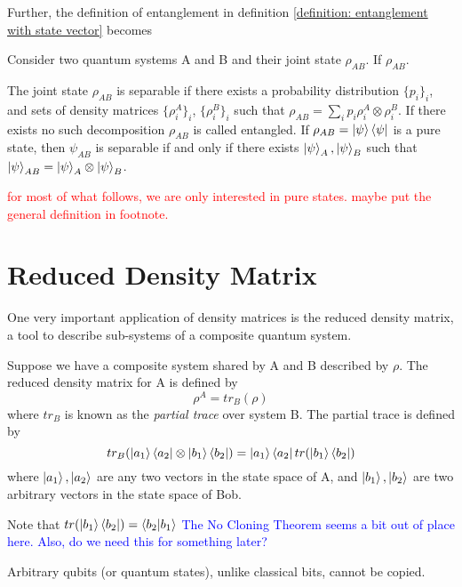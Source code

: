 
\bigskip
Further, the definition of entanglement in definition \ref{definition: entanglement with state vector} becomes 
\begin{definition}[Entanglement]
 Consider two quantum systems A and B and their joint state $\rho_{AB}$. If $\rho_{AB}$.
 
 The joint state $\rho_{AB}$ is separable if there exists a probability distribution $\{p_i\}_i$, and sets of density matrices $\{\rho_i^A\}_i$, $\{\rho_i^B\}_i$ such that $\rho_{AB}=\sum_i p_i\rho_i^A\otimes\rho_i^B$.
 If there exists no such decomposition $\rho_{AB}$ is called entangled.
 If $\rho_{AB}=\ket{\psi}\bra{\psi}$ is a pure state, then $\psi_{AB}$ is separable if and only if there exists $\ket{\psi}_A, \ket{\psi}_B$ such that $\ket{\psi}_{AB}=\ket{\psi}_A \otimes \ket{\psi}_B$.
\end{definition}

\textcolor{red}{for most of what follows, we are only interested in pure states. maybe put the general definition in footnote.}

\section{Reduced Density Matrix}
One very important application of density matrices is the reduced density matrix, a tool to describe sub-systems of a composite quantum system.
\begin{definition}
 Suppose we have a composite system shared by A and B described by $\rho$. The reduced density matrix for A is defined by
\begin{equation}
    \rho^A=tr_B (\rho)
\end{equation}
where $tr_B$ is known as the \textit{partial trace} over system B. The partial trace is defined by
\begin{equation}
tr_B(\ket{a_1}\bra{a_2} \otimes \ket{b_1} \bra{b_2})=\ket{a_1}\bra{a_2}tr(\ket{b_1}\bra{b_2})
\end{equation}
where $\ket{a_1}, \ket{a_2}$ are any two vectors in the state space of A, and $\ket{b_1}, \ket{b_2}$ are two arbitrary vectors in the state space of Bob.
\end{definition}
Note that $tr(\ket{b_1}\bra{b_2})=\braket{b_2|b_1}$
\textcolor{blue}{The No Cloning Theorem seems a bit out of place here.  Also, do we need this for something later?}
\begin{theorem} \label{no-cloning thm}
Arbitrary qubits (or quantum states), unlike classical bits, cannot be copied. 
\end{theorem} 


